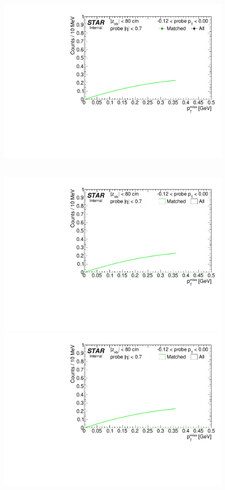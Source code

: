 \begin{figure}[ht]
{  \includegraphics[width=\linewidth,page=9]{graphics/systematicsEfficiency/TOF_tagAndProbe/Fitting_effVsPt_data.pdf}
}~
\parbox{0.495\textwidth}{
  \centering
  \includegraphics[width=\linewidth,page=7]{graphics/systematicsEfficiency/TOF_tagAndProbe/Fitting_effVsPt_mc.pdf}\\
  \includegraphics[width=\linewidth,page=8]{graphics/systematicsEfficiency/TOF_tagAndProbe/Fitting_effVsPt_mc.pdf}\\
}
\end{figure}
